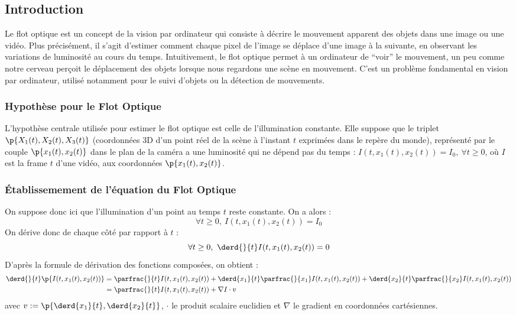 \documentclass{magnolia}
\begin{document}
\subsection{Introduction}
Le flot optique \cite{flow} est un concept de la vision par ordinateur qui consiste à décrire le mouvement apparent des objets dans une image ou une vidéo. Plus précisément, il s'agit d'estimer comment chaque pixel de l'image se déplace d'une image à la suivante, en observant les variations de luminosité au cours du temps. Intuitivement, le flot optique permet à un ordinateur de “voir” le mouvement, un peu comme notre cerveau perçoit le déplacement des objets lorsque nous regardons une scène en mouvement. C'est un problème fondamental en vision par ordinateur, utilisé notamment pour le suivi d'objets ou la détection de mouvements.
\subsubsection{Hypothèse pour le Flot Optique}
L'hypothèse centrale utilisée pour estimer le flot optique est celle de l'illumination constante. Elle suppose que le triplet $\p{X_1(t),X_2(t),X_3(t)}$ (coordonnées 3D d'un point réel de la scène à l'instant $t$ exprimées dans le repère du monde), représenté par le couple $\p{x_1(t),x_2(t)}$ dans le plan de la caméra a une luminosité qui ne dépend pas du temps : $I(t,x_1(t),x_2(t))=I_0, \ \forall t\geq 0$, où $I$ est la frame $t$ d'une vidéo, aux coordonnées $\p{x_1(t),x_2(t)}$.

\subsubsection{Établissemement de l'équation du Flot Optique}
On suppose donc ici que l'illumination d'un point au temps $t$ reste constante.
On a alors :
\[ \forall t\geq 0, \ I(t,x_1(t),x_2(t))=I_0\]
On dérive donc de chaque côté par rapport à $t$ :
\[ \forall t\geq 0, \ \derd{}{t}I(t,x_1(t),x_2(t))=0\]
D'après la formule de dérivation des fonctions composées, on obtient :
\begin{align*}
    \displaystyle\derd{}{t}\p{I(t,x_1(t),x_2(t))}&= \parfrac{}{t}I(t,x_1(t),x_2(t))+\derd{x_1}{t}\parfrac{}{x_1}I(t,x_1(t),x_2(t))+\derd{x_2}{t}\parfrac{}{x_2}I(t,x_1(t),x_2(t))\\
     &=\parfrac{}{t}I(t,x_1(t),x_2(t)) + \nabla I\cdot v
\end{align*}
avec $v:=\p{\displaystyle\derd{x_1}{t},\displaystyle\derd{x_2}{t}}$, $\cdot$ le produit scalaire euclidien et $\nabla$ le gradient en coordonnées cartésiennes.\\
\end{document}
